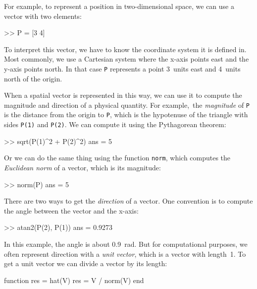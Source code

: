 
For example, to represent a position in two-dimensional space, we can use a vector with two elements:

\begin{code}
>> P = [3 4]
\end{code}

To interpret this vector, we have to know the coordinate system it is defined in.  Most commonly, we use a Cartesian system where the x-axis points east and the y-axis points north.  In that case \lstinline{P} represents a point 3~units east and 4~units north of the origin.


When a spatial vector is represented in this way, we can use it to compute the magnitude and direction of a physical quantity.  
For example,~the \emph{magnitude} of \lstinline{P} is the distance from the origin to \lstinline{P}, which is the hypotenuse of the triangle with sides \lstinline{P(1)} and \lstinline{P(2)}.  
We can compute it using the Pytha\-gorean theorem:

\begin{code}
>> sqrt(P(1)^2 + P(2)^2)
ans = 5
\end{code}

Or we can do the same thing using the function \lstinline{norm}, which computes the
\emph{Euclidean norm} of a vector, which is its magnitude:


\begin{code}
>> norm(P)
ans = 5
\end{code}

There are two ways to get the \emph{direction} of a vector.  One convention is to compute the angle between the vector and the x-axis:

\begin{code}
>> atan2(P(2), P(1))
ans = 0.9273
\end{code}

In this example, the angle is about \SI{0.9}{\radian}.  But for computational purposes, we often represent direction with a \emph{unit vector}, which is a vector with length~1.  To get a unit vector we can divide a vector by its length:

\begin{code}
function res = hat(V)
    res = V / norm(V)
end
\end{code}
 

